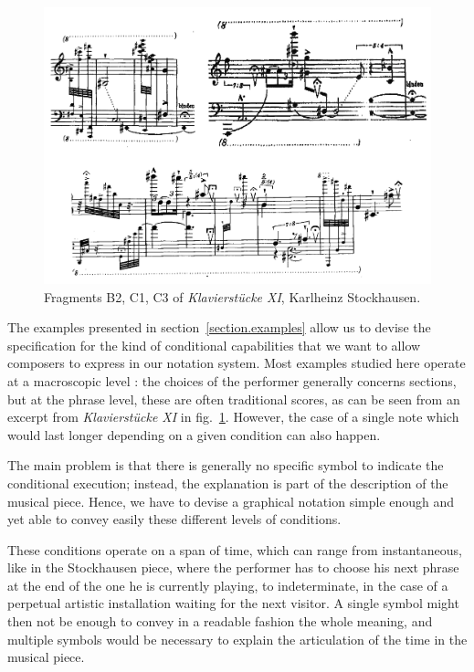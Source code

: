\documentclass{article}
\newcommand{\klavierstuck}{\emph{Klavierstücke XI}}
\begin{document}
	\begin{figure}
	\centering
	\includegraphics[width=0.9\columnwidth]{klavierstuck.png}
	\caption{Fragments B2, C1, C3 of \klavierstuck{}, Karlheinz Stockhausen.\protect\footnotemark}
	\label{fig.klavierstuck}
	\end{figure}
	The examples presented in section~\ref{section.examples} allow us to devise the specification for the kind of conditional capabilities that we want to allow composers to express in our notation system.
	Most examples studied here operate at a macroscopic level : the choices of the performer generally concerns sections, but at the phrase level, these are often traditional scores, as can be seen from an excerpt from \klavierstuck{} in fig.~\ref{fig.klavierstuck}. However, the case of a single note which would last longer depending on a given condition can also happen.
	
	The main problem is that there is generally no specific symbol to indicate the conditional execution; instead, the explanation is part of the description of the musical piece. Hence, we have to devise a graphical notation simple enough and yet able to convey easily these different levels of conditions.
	
	These conditions operate on a span of time, which can range from instantaneous, like in the Stockhausen piece, where the performer has to choose his next phrase at the end of the one he is currently playing, to indeterminate, in the case of a perpetual artistic installation waiting for the next visitor. A single symbol might then not be enough to convey in a readable fashion the whole meaning, and multiple symbols would be necessary to explain the articulation of the time in the musical piece.
	
\end{document}
